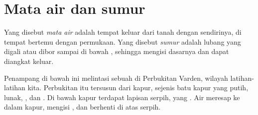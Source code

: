 \section{Mata air dan sumur}

\begin{definition}\label{def:g6:water-underground:spring}
Yang disebut \emph{mata air} adalah tempat  keluar
dari tanah dengan sendirinya, di tempat  bertemu dengan
permukaan. Yang disebut \emph{sumur} adalah lubang yang digali
atau dibor sampai di bawah , sehingga  mengisi
dasarnya dan dapat diangkat keluar.
\end{definition}

Penampang di bawah ini melintasi sebuah  di Perbukitan Varden, wilayah
latihan-latihan kita. Perbukitan itu tersusun dari kapur, sejenis batu kapur
yang putih, lunak, , dan . Di bawah kapur terdapat lapisan
serpih, yang . Air  meresap ke dalam kapur, mengisi
, dan berhenti di atas serpih.

